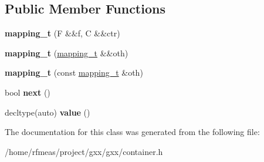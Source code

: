 \subsection*{Public Member Functions}
\begin{DoxyCompactItemize}
\item 
{\bfseries mapping\+\_\+t} (F \&\&f, C \&\&ctr)\hypertarget{classgxx_1_1gen_1_1mapping__t_ac0af2df6e0490e36928c2f5a0446a3c6}{}\label{classgxx_1_1gen_1_1mapping__t_ac0af2df6e0490e36928c2f5a0446a3c6}

\item 
{\bfseries mapping\+\_\+t} (\hyperlink{classgxx_1_1gen_1_1mapping__t}{mapping\+\_\+t} \&\&oth)\hypertarget{classgxx_1_1gen_1_1mapping__t_a7a5cfe234fcc249195dca830c584513a}{}\label{classgxx_1_1gen_1_1mapping__t_a7a5cfe234fcc249195dca830c584513a}

\item 
{\bfseries mapping\+\_\+t} (const \hyperlink{classgxx_1_1gen_1_1mapping__t}{mapping\+\_\+t} \&oth)\hypertarget{classgxx_1_1gen_1_1mapping__t_ab8654ebf27e8c5e1aeaa0ee9bbedb1f4}{}\label{classgxx_1_1gen_1_1mapping__t_ab8654ebf27e8c5e1aeaa0ee9bbedb1f4}

\item 
bool {\bfseries next} ()\hypertarget{classgxx_1_1gen_1_1mapping__t_ae1e7a87acf938fc543b4e1cd86f0cc87}{}\label{classgxx_1_1gen_1_1mapping__t_ae1e7a87acf938fc543b4e1cd86f0cc87}

\item 
decltype(auto) {\bfseries value} ()\hypertarget{classgxx_1_1gen_1_1mapping__t_a30c28a36ba25db2e89ae7d9d0791d2c3}{}\label{classgxx_1_1gen_1_1mapping__t_a30c28a36ba25db2e89ae7d9d0791d2c3}

\end{DoxyCompactItemize}


The documentation for this class was generated from the following file\+:\begin{DoxyCompactItemize}
\item 
/home/rfmeas/project/gxx/gxx/container.\+h\end{DoxyCompactItemize}
